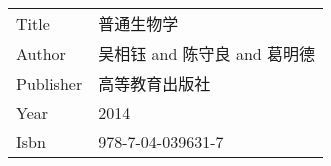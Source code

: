 

\begin{table}[H]
    \begin{tabular}{@{·}l@{ : }l}
        Title     & 普通生物学                    \\
        Author    & 吴相钰 and 陈守良 and 葛明德   \\
        Publisher & 高等教育出版社                 \\
        Year      & 2014                          \\
        Isbn      & 978-7-04-039631-7
    \end{tabular}
\end{table}

